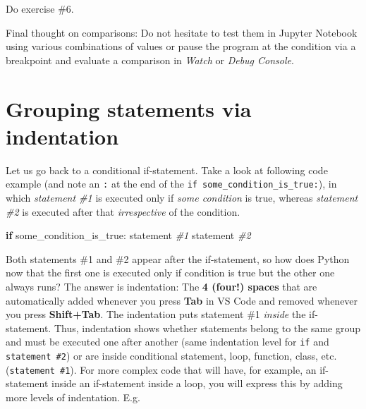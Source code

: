 \documentclass[
]{book}
\newenvironment{Shaded}{\begin{snugshade}}{\end{snugshade}}
\newcommand{\CommentTok}[1]{\textcolor[rgb]{0.56,0.35,0.01}{\textit{#1}}}
\newcommand{\ControlFlowTok}[1]{\textcolor[rgb]{0.13,0.29,0.53}{\textbf{#1}}}
\newcommand{\NormalTok}[1]{#1}
\begin{document}
Do exercise \#6.

Final thought on comparisons: Do not hesitate to test them in Jupyter Notebook using various combinations of values or pause the program at the condition via a breakpoint and evaluate a comparison in \emph{Watch} or \emph{Debug Console}.

\hypertarget{indentation}{%
\section{Grouping statements via indentation}\label{indentation}}

Let us go back to a conditional if-statement. Take a look at following code example (and note an \texttt{:} at the end of the \texttt{if\ some\_condition\_is\_true:}), in which \emph{statement \#1} is executed only if \emph{some condition} is true, whereas \emph{statement \#2} is executed after that \emph{irrespective} of the condition.

\begin{Shaded}
\begin{Highlighting}[]
\ControlFlowTok{if}\NormalTok{ some\_condition\_is\_true:}
\NormalTok{    statement }\CommentTok{\#1}
\NormalTok{statement }\CommentTok{\#2 }
\end{Highlighting}
\end{Shaded}

Both statements \#1 and \#2 appear after the if-statement, so how does Python now that the first one is executed only if condition is true but the other one always runs? The answer is indentation: The \textbf{4 (four!) spaces} that are automatically added whenever you press \textbf{Tab} in VS Code and removed whenever you press \textbf{Shift+Tab}. The indentation puts statement \#1 \emph{inside} the if-statement. Thus, indentation shows whether statements belong to the same group and must be executed one after another (same indentation level for \texttt{if} and \texttt{statement\ \#2}) or are inside conditional statement, loop, function, class, etc. (\texttt{statement\ \#1}). For more complex code that will have, for example, an if-statement inside an if-statement inside a loop, you will express this by adding more levels of indentation. E.g.
\end{document}
